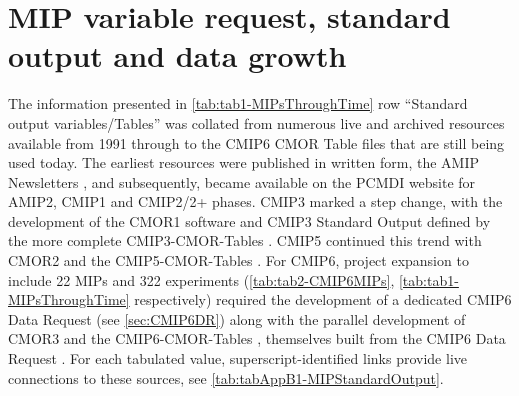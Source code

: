 \documentclass[manuscript]{copernicus}
\begin{document}
\section{MIP variable request, standard output and data growth}  %
\label{sec:secAppB1-MIPStandardOutput}
The information presented in \autoref{tab:tab1-MIPsThroughTime} row ``Standard output variables/Tables'' was collated from numerous live and archived resources available from 1991 through to the CMIP6 CMOR Table files that are still being used today. The earliest resources were published in written form, the AMIP Newsletters \citep[e.g.,][]{gates_amip_1991}, and subsequently, became available on the PCMDI website for AMIP2, CMIP1 and CMIP2/2+ phases. CMIP3 marked a step change, with the development of the CMOR1 software \citep{taylor_cmor_2006} and CMIP3 Standard Output defined by the more complete CMIP3-CMOR-Tables \citep{doutriaux_cmip3_2005}. CMIP5 continued this trend with CMOR2 \citep{doutriaux_cmor_2011} and the CMIP5-CMOR-Tables \citep{doutriaux_cmip5_2013}. For CMIP6, project expansion to include 22 MIPs and 322 experiments (\autoref{tab:tab2-CMIP6MIPs}, \autoref{tab:tab1-MIPsThroughTime} respectively) required the development of a dedicated CMIP6 Data Request (see \autoref{sec:CMIP6DR}) along with the parallel development of CMOR3 \citep{mauzey_cmor_2024} and the CMIP6-CMOR-Tables \citep{nadeau_cmip6_2017}, themselves built from the CMIP6 Data Request \citep{juckes_cmip6_2020}. For each tabulated value, superscript-identified links provide live connections to these sources, see \autoref{tab:tabAppB1-MIPStandardOutput}.
\end{document}
